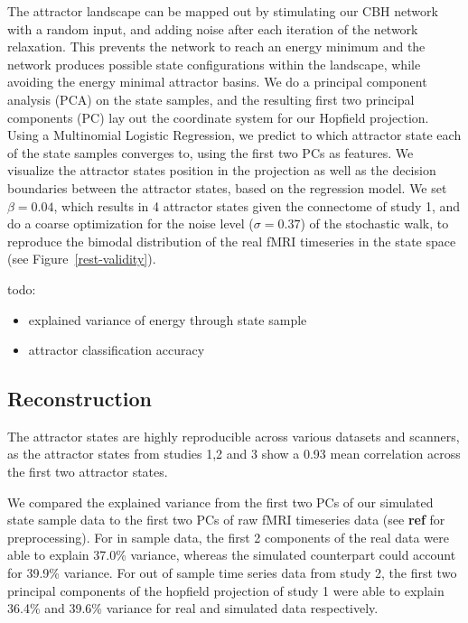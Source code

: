 \documentclass{article}
\begin{document}
The attractor landscape can be mapped out by stimulating our CBH network with a random input, and adding noise after
each iteration of the network relaxation. This prevents the network to reach an energy minimum and the network
produces possible state configurations within the landscape, while avoiding the energy minimal attractor basins.
We do a principal component analysis (PCA) on the state samples, and the resulting first two principal components (PC)
lay out the coordinate system for our Hopfield projection. Using a Multinomial Logistic Regression, we predict to which
attractor state each of the state samples converges to, using the first two PCs as features. We visualize the attractor
states position in the projection as well as the decision boundaries between the attractor states, based on the
regression model. We set $\beta = 0.04$, which results in 4 attractor states given the connectome of study 1, and do a
coarse optimization for the noise level ($\sigma=0.37$) of the stochastic walk, to reproduce the bimodal distribution
of the real fMRI timeseries in the state space (see Figure~\ref{rest-validity}).

todo:

\begin{itemize}
\item explained variance of energy through state sample
\item attractor classification accuracy
\end{itemize}

\subsection{Reconstruction}\label{Reconstruction}

The attractor states are highly reproducible across various datasets and scanners, as the attractor states from studies
1,2 and 3 show a 0.93 mean correlation across the first two attractor states.

We compared the explained variance from the first two PCs of our simulated state sample data to the first two PCs of
raw fMRI timeseries data (see \textbf{ref} for preprocessing). For in sample data, the first 2 components of the real data
were able to explain 37.0\% variance, whereas the simulated counterpart could account for 39.9\% variance. For out of
sample time series data from study 2, the first two principal components of the hopfield projection of study 1 were
able to explain 36.4\% and 39.6\% variance for real and simulated data respectively.
\end{document}
